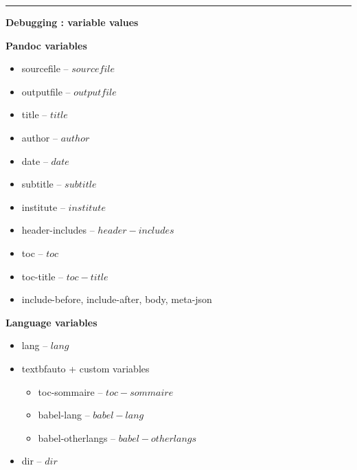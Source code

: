 \documentclass[$if(fontsize)$$fontsize$,$endif$$if(lang)$$babel-lang$,$endif$$if(papersize)$$papersize$paper,$endif$$for(classoption)$$classoption$$sep$,$endfor$]{$documentclass$}
\begin{document}
{
\begin{centering}
\rule{2in}{0.4pt} 

\Large{\textbf{Debugging : variable values}}

\end{centering}


\textbf{Pandoc variables}

\begin{itemize}
        \item sourcefile -- $sourcefile$
        \item outputfile -- $outputfile$
        \item title -- $title$
        \item author -- $author$ %
        \item date -- $date$
        \item subtitle -- $subtitle$
        \item institute -- $institute$
        \item header-includes -- $header-includes$
        \item toc -- $toc$
        \item toc-title -- $toc-title$ %
        \item include-before, include-after, body, meta-json
\end{itemize}


\textbf{Language variables}
\begin{itemize}
        \item lang -- $lang$
        \item textbf{auto + custom variables}
        \begin{itemize}
                \item toc-sommaire -- $toc-sommaire$
                \item babel-lang -- $babel-lang$
                \item babel-otherlangs -- $babel-otherlangs$
        \end{itemize}
        \item dir -- $dir$ %
\end{itemize}


}
\end{document}
